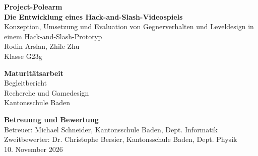 \documentclass[10pt]{article}
\begin{document}

\begin{titlepage}
    \begin{center}
        \vspace*{2cm}

        \textbf{\Huge{Project-Polearm}} \\ [2em]
        \textbf{\Large Die Entwicklung eines Hack-and-Slash-Videospiels} \\ [0.6em]
        \large{Konzeption, Umsetzung und Evaluation von Gegnerverhalten und Leveldesign in einem Hack-and-Slash-Prototyp} \\ [2em]

        \Large{Rodin Arslan, Zhile Zhu} \\ [0.5em]
        \large{Klasse G23g}

        \vspace{3cm}

        \LARGE{\textbf{Maturitätsarbeit}} \\ [0.3em]
        \Large{Begleitbericht} \\
        \large{Recherche und Gamedesign} \\ [0.5em]
        \large{Kantonsschule Baden}

        \vfill

        \Large{\textbf{Betreuung und Bewertung}} \\ [0.5em]
        \large{Betreuer: Michael Schneider, Kantonsschule Baden, Dept. Informatik} \\
        \large{Zweitbewerter: Dr. Christophe Bersier, Kantonsschule Baden, Dept. Physik} \\

        \vspace{2cm}
        \large{10. November 2026}
    \end{center}
\end{titlepage}

\newpage

\end{document}
